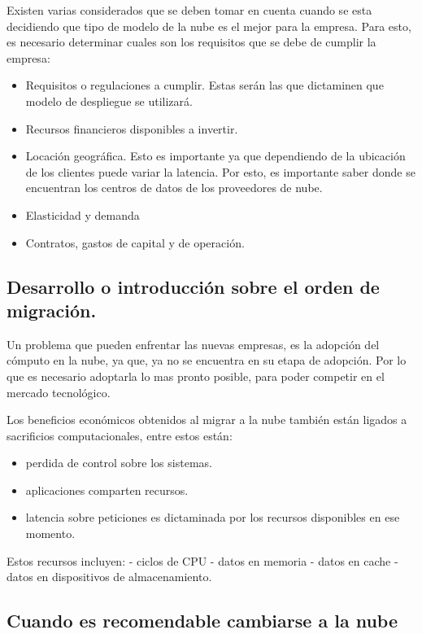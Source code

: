 \documentclass[12pt,twoside]{reedthesis}
\providecommand{\tightlist}{%
  \setlength{\itemsep}{0pt}\setlength{\parskip}{0pt}}
\begin{document}
Existen varias considerados que se deben tomar en cuenta cuando se esta decidiendo que tipo de modelo de la nube es el mejor para la empresa. Para esto, es necesario determinar cuales son los requisitos que se debe de cumplir la empresa:
\begin{itemize}
\tightlist
\item
  Requisitos o regulaciones a cumplir. Estas serán las que dictaminen que modelo de despliegue se utilizará.
\item
  Recursos financieros disponibles a invertir.
\item
  Locación geográfica. Esto es importante ya que dependiendo de la ubicación de los clientes puede variar la latencia. Por esto, es importante saber donde se encuentran los centros de datos de los proveedores de nube.
\item
  Elasticidad y demanda
\item
  Contratos, gastos de capital y de operación.
\end{itemize}
\hypertarget{desarrollo-o-introduccion-sobre-el-orden-de-migracion.}{%
\subsection{Desarrollo o introducción sobre el orden de migración.}\label{desarrollo-o-introduccion-sobre-el-orden-de-migracion.}}

Un problema que pueden enfrentar las nuevas empresas, es la adopción del cómputo en la nube, ya que, ya no se encuentra en su etapa de adopción. Por lo que es necesario adoptarla lo mas pronto posible, para poder competir en el mercado tecnológico.

Los beneficios económicos obtenidos al migrar a la nube también están ligados a sacrificios computacionales, entre estos están:
\begin{itemize}
\tightlist
\item
  perdida de control sobre los sistemas.
\item
  aplicaciones comparten recursos.
\item
  latencia sobre peticiones es dictaminada por los recursos disponibles en ese momento.
\end{itemize}
Estos recursos incluyen:
- ciclos de CPU
- datos en memoria
- datos en cache
- datos en dispositivos de almacenamiento.

\hypertarget{cuando-es-recomendable-cambiarse-a-la-nube}{%
\subsection{Cuando es recomendable cambiarse a la nube}\label{cuando-es-recomendable-cambiarse-a-la-nube}}
\end{document}

